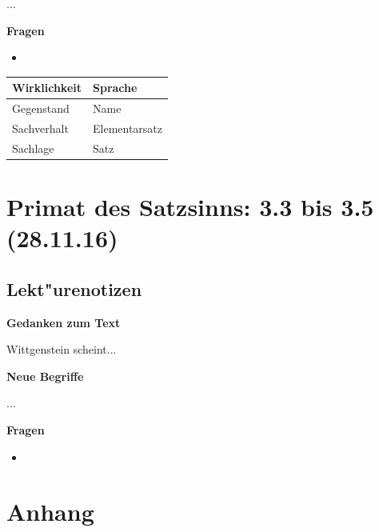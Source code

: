 \documentclass[]{scrartcl}
\begin{document}
\begin{description}[leftmargin=!,labelwidth=\widthof{\bfseries Sachverhalt}]
  \item[Bild] ...
  \item[Tatsache] 
\end{description}

\textbf{Fragen}

\begin{itemize}
  \item 
\end{itemize}

\begin{center}
    \begin{tabular}{  l | l }
    \textbf{Wirklichkeit} & \textbf{Sprache}\\ \hline
    Gegenstand & Name \\ 
    Sachverhalt & Elementarsatz \\
    Sachlage & Satz \\
    \end{tabular}
\end{center}


\section{Primat des Satzsinns: 3.3 bis 3.5\\(28.11.16)}


\subsection{Lekt"urenotizen}
\textbf{Gedanken zum Text}

Wittgenstein scheint...

\vspace{10pt}
\textbf{Neue Begriffe}

\begin{description}[leftmargin=!,labelwidth=\widthof{\bfseries Sachverhalt}]
  \item[Bild] ...
  \item[Tatsache] 
\end{description}

\textbf{Fragen}

\begin{itemize}
  \item 
\end{itemize}



\newpage
\section{Anhang}
\end{document}
